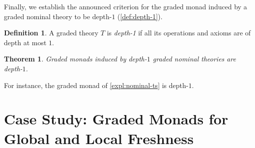 \documentclass[11pt,a4paper]{amsart}
\newtheorem{theorem}{Theorem}[section]
\theoremstyle{plain}
\numberwithin{equation}{section}
\newcommand{\+}[1]{\mathcal{#1}\xspace}
\theoremstyle{definition}
\newtheorem{defn}[defn]{Definition}
\begin{document}
\noindent Finally, we establish the announced criterion for the graded
monad induced by a graded nominal theory to be depth-$1$
(\cref{def:depth-1}).
\begin{defn}
  A graded theory \(T\) is \emph{depth-1} if all its operations and
  axioms are of depth at most $1$.
\end{defn}

\begin{theorem}\label{thm:depth1}
  Graded monads induced by depth-$1$ graded nominal theories are
  depth-$1$.
\end{theorem}

\noindent For instance, the graded monad of \cref{expl:nominal-ts} is
depth-$1$.


\section{Case Study: Graded Monads for Global and  Local Freshness}
\label{sec:local-freshness}
\end{document}

